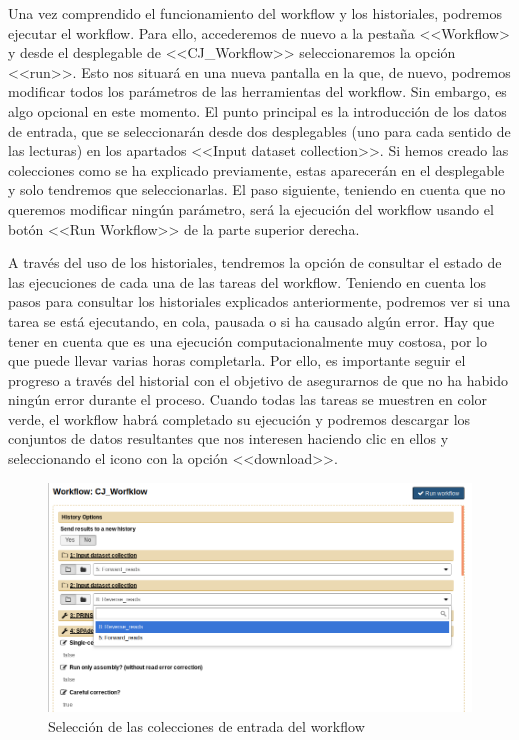 Una vez comprendido el funcionamiento del workflow y los historiales, podremos ejecutar el workflow. Para ello, accederemos de nuevo a la pestaña <<Workflow> y desde el desplegable de <<CJ\_Workflow>> seleccionaremos la opción <<run>>. Esto nos situará en una nueva pantalla en la que, de nuevo, podremos modificar todos los parámetros de las herramientas del workflow. Sin embargo, es algo opcional en este momento. El punto principal es la introducción de los datos de entrada, que se seleccionarán desde dos desplegables (uno para cada sentido de las lecturas) en los apartados <<Input dataset collection>>. Si hemos creado las colecciones como se ha explicado previamente, estas aparecerán en el desplegable y solo tendremos que seleccionarlas. El paso siguiente, teniendo en cuenta que no queremos modificar ningún parámetro, será la ejecución del workflow usando el botón <<Run Workflow>> de la parte superior derecha.

A través del uso de los historiales, tendremos la opción de consultar el estado de las ejecuciones de cada una de las tareas del workflow. Teniendo en cuenta los pasos para consultar los historiales explicados anteriormente, podremos ver si una tarea se está ejecutando, en cola, pausada o si ha  causado algún error. Hay que tener en cuenta que es una ejecución computacionalmente muy costosa, por lo que puede llevar varias horas completarla. Por ello, es importante seguir el progreso a través del historial con el objetivo de asegurarnos de que no ha habido ningún error durante el proceso. Cuando todas las tareas se muestren en color verde, el workflow habrá completado su ejecución y podremos descargar los conjuntos de datos resultantes que nos interesen haciendo clic en ellos y seleccionando el icono con la opción <<download>>.

\begin{figure}
    \begin{center}
      \includegraphics[scale=0.5]{images/RunInputs.png}
      \caption{Selección de las colecciones de entrada del workflow}
      \label{fig:RunInputs}
    \end{center}
\end{figure}

